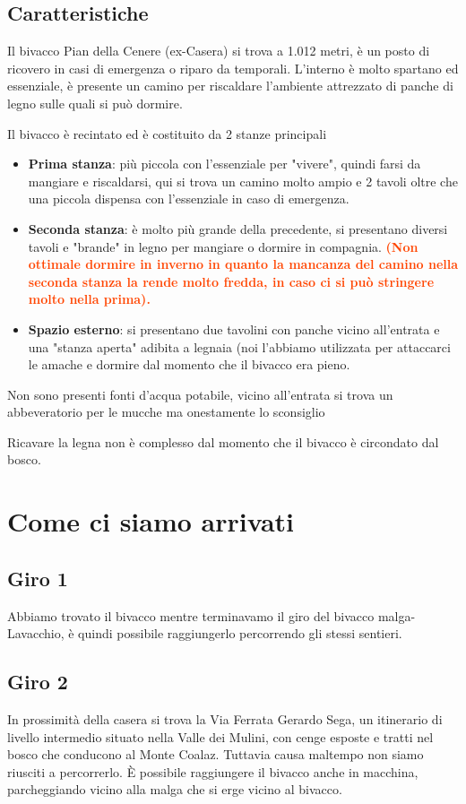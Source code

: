 \documentclass{article}
\begin{document}
\subsection{Caratteristiche}
Il bivacco Pian della Cenere (ex-Casera) si trova a 1.012 metri, è un posto di ricovero in casi di emergenza o riparo da temporali. L'interno è molto spartano ed essenziale, è presente un camino per riscaldare l'ambiente attrezzato di panche di legno sulle quali si può dormire.
 
Il bivacco è recintato ed è costituito da 2 stanze principali
\begin{itemize}
    \item \textbf{Prima stanza}: più piccola con l'essenziale per "vivere", quindi farsi da mangiare e riscaldarsi, qui si trova un camino molto ampio e 2 tavoli oltre che una piccola dispensa con l'essenziale in caso di emergenza.
    \item \textbf{Seconda stanza}: è molto più grande della precedente, si presentano diversi tavoli e "brande" in legno per mangiare o dormire in compagnia. \textbf{\textcolor{OrangeRed}{(Non ottimale dormire in inverno in quanto la mancanza del camino nella seconda stanza la rende molto fredda, in caso ci si può stringere molto nella prima).}}
    \item \textbf{Spazio esterno}: si presentano due tavolini con panche vicino all'entrata e una "stanza aperta" adibita a legnaia (noi l'abbiamo utilizzata per attaccarci le amache e dormire dal momento che il bivacco era pieno.
\end{itemize}

Non sono presenti fonti d'acqua potabile, vicino all'entrata si trova un abbeveratorio per le mucche ma onestamente lo sconsiglio

Ricavare la legna non è complesso dal momento che il bivacco è circondato dal bosco.

\section{Come ci siamo arrivati}
\subsection{Giro 1}
Abbiamo trovato il bivacco mentre terminavamo il giro del bivacco malga-Lavacchio, è quindi possibile raggiungerlo percorrendo gli stessi sentieri.

\subsection{Giro 2}
In prossimità della casera si trova la Via Ferrata Gerardo Sega, un itinerario di livello intermedio situato nella Valle dei Mulini, con cenge esposte e tratti nel bosco che conducono al Monte Coalaz. Tuttavia causa maltempo non siamo riusciti a percorrerlo. È possibile raggiungere il bivacco anche in macchina, parcheggiando vicino alla malga che si erge vicino al bivacco.
\end{document}
